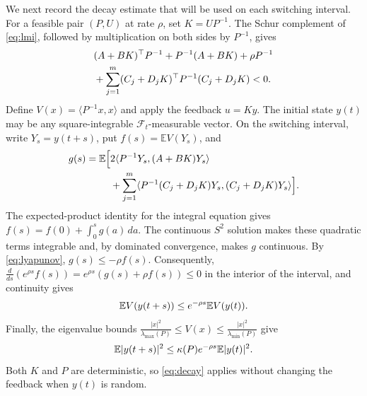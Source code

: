 \documentclass[twocolumn]{autart}
\begin{document}
\vspace{-4mm}

We next record the decay estimate that will be used on each switching
interval. For a feasible pair $(P,U)$ at rate $\rho$, set
$K=UP^{-1}$. The Schur complement of \cref{eq:lmi}, followed by
multiplication on both sides by $P^{-1}$, gives\vspace{-3mm}
\begin{equation}\label{eq:lyapunov}
\begin{aligned}
&(A+BK)^{\top}P^{-1}+P^{-1}(A+BK)+\rho P^{-1} \\
& +\sum_{j=1}^m(C_j+D_jK)^{\top}P^{-1}(C_j+D_jK)<0.
\end{aligned}\vspace{-3mm}
\end{equation}
Define $V(x)=\langle P^{-1}x,x\rangle$ and apply the feedback $u=Ky$.
The initial state $y(t)$ may be any square-integrable
$\mathcal F_t$-measurable vector. On the switching interval, write
$Y_s=y(t+s)$, put $f(s)=\mathbb EV(Y_s)$, and\vspace{-2mm}
\begin{equation*}
\begin{aligned}
g(s)=\mathbb E\Bigl[&2\langle P^{-1}Y_s,(A+BK)Y_s\rangle\\
&+\sum_{j=1}^m\langle P^{-1}(C_j+D_jK)Y_s,(C_j+D_jK)Y_s\rangle\Bigr].
\end{aligned}\vspace{-2mm}
\end{equation*}
The expected-product identity for the integral equation gives
$f(s)=f(0)+\int_0^s g(a)\,da$. The continuous $S^2$ solution makes
these quadratic terms integrable and, by dominated convergence, makes
$g$ continuous. By \cref{eq:lyapunov}, $g(s)\leq-\rho f(s)$.
Consequently,
$\frac{d}{ds}(e^{\rho s}f(s))=e^{\rho s}(g(s)+\rho f(s))\leq0$
in the interior of the interval, and continuity gives\vspace{-3mm}
\begin{equation*}
\mathbb EV(y(t+s))\leq e^{-\rho s}\mathbb EV(y(t)).\vspace{-3mm}
\end{equation*}
Finally, the eigenvalue bounds
$
\frac{|x|^2}{\lambda_{\max}(P)}
\leq V(x)\leq\frac{|x|^2}{\lambda_{\min}(P)}
$
give\vspace{-4mm}
\begin{equation}\label{eq:decay}
\mathbb E|y(t+s)|^2\leq\kappa(P)e^{-\rho s}\mathbb E|y(t)|^2.\vspace{-2mm}
\end{equation}
Both $K$ and $P$ are deterministic, so \cref{eq:decay} applies without
changing the feedback when $y(t)$ is random.
\end{document}
